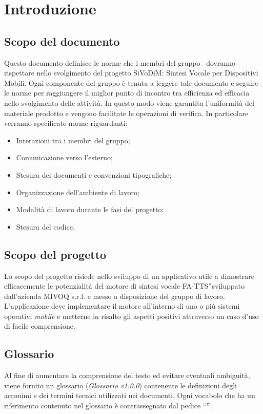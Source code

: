 \section{Introduzione}

\subsection{Scopo del documento}
Questo documento definisce le norme che i membri del gruppo \GRUPPO\ dovranno rispettare nello svolgimento del progetto SiVoDiM: Sintesi Vocale per Dispositivi Mobili. Ogni componente del gruppo è tenuta a leggere tale documento e seguire le norme per raggiungere il miglior punto di incontro tra efficienza ed efficacia nello svolgimento delle attività. In questo modo viene garantita l'uniformità del materiale prodotto e vengono facilitate le operazioni di verifica. In particolare verranno specificate norme riguardanti:
\begin{itemize}
	\item	Interazioni tra i membri del gruppo;
	\item	Comunicazione verso l'esterno;
	\item	Stesura dei documenti e convenzioni tipografiche;
	\item	Organizzazione dell'ambiente di lavoro;
	\item	Modalità di lavoro durante le fasi del progetto;
	\item	Stesura del codice.
\end{itemize}

\subsection{Scopo del progetto}
Lo scopo del progetto risiede nello sviluppo di un applicativo utile a  dimostrare efficacemente le potenzialità del motore di sintesi vocale FA-TTS\G\ sviluppato dall'azienda MIVOQ s.r.l. e messo a disposizione del gruppo di lavoro. L'applicazione deve implementare il motore all'interno di uno o più sistemi operativi \textit{mobile} e metterne in risalto gli aspetti positivi attraverso un caso d'uso di facile comprensione.

\subsection{Glossario}
Al fine di aumentare la comprensione del testo ed evitare eventuali ambiguità, viene fornito un glossario (\textit{Glossario v1.0.0}) contenente le definizioni degli acronimi e dei termini tecnici utilizzati nei documenti. Ogni vocabolo che ha un riferimento contenuto nel glossario è contrassegnato dal pedice “\G “.

